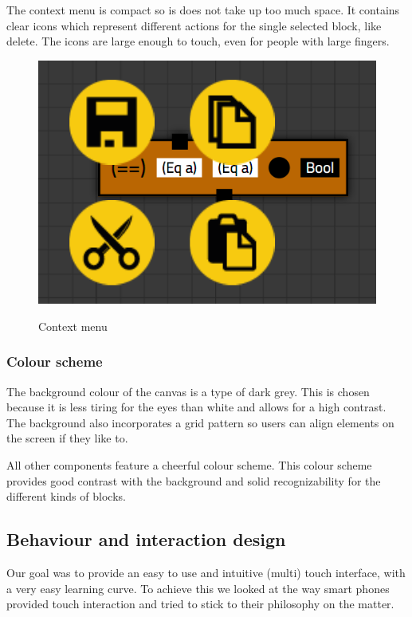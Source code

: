 The context menu is compact so is does not take up too much space. 
It contains clear icons which represent different actions for the single selected block, like delete.
The icons are large enough to touch, even for people with large fingers.

\begin{figure}[p]
	\centering
	\includegraphics[scale=0.5]{Images/blocks-menu}
	\label{fig:blocks-menu}
	\caption{Context menu}
\end{figure}

\subsubsection{Colour scheme}

The background colour of the canvas is a type of dark grey.
This is chosen because it is less tiring for the eyes than white and allows for a high contrast.
The background also incorporates a grid pattern so users can align elements on the screen if they like to.

All other components feature a cheerful colour scheme.
This colour scheme provides good contrast with the background and solid recognizability for the different kinds of blocks.

\subsection{Behaviour and interaction design}

Our goal was to provide an easy to use and intuitive (multi) touch interface, with a very easy learning curve. To achieve this we looked at the way smart phones provided touch interaction and tried to stick to their philosophy on the matter.

